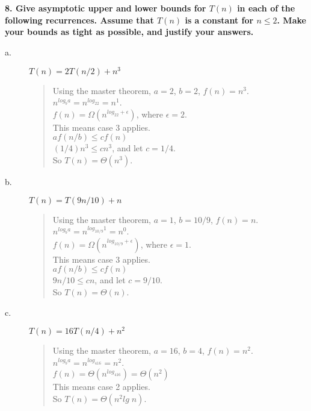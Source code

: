 \documentclass{article}
\begin{document}
\section*{}
\textbf{8. Give asymptotic upper and lower bounds for $T(n)$ in each of the following recurrences.
Assume that $T(n)$ is a constant for $n\leq2$. Make your bounds as tight as possible, 
and justify your answers.}

\begin{description}
\item[a.]$T(n) = 2T(n/2) + n^3$
\begin{quote}
\textsf{Using the master theorem, $a = 2$, $b = 2$, $f(n) = n^3$.\\
$n^{log_ba} = n^{log_22} = n^1$.\\
$f(n) = \Omega(n^{log_22 + \epsilon})$, where $\epsilon = 2$.\\
This means case 3 applies.\\
$af(n/b) \leq cf(n)$\\
$(1/4)n^3 \leq cn^3$, and let $c = 1/4$.\\
So $T(n) = \Theta(n^3)$.}
\end{quote}

\item[b.]$T(n) = T(9n/10) + n$
\begin{quote}
\textsf{Using the master theorem, $a = 1$, $b = 10/9$, $f(n) = n$.\\
$n^{log_ba} = n^{log_{10/9}1} = n^0$.\\
$f(n) = \Omega(n^{log_{10/9} + \epsilon})$, where $\epsilon = 1$.\\
This means case 3 applies.\\
$af(n/b) \leq cf(n)$\\
$9n/10 \leq cn$, and let $c = 9/10$.\\
So $T(n) = \Theta(n)$.}
\end{quote}

\item[c.]$T(n) = 16T(n/4) + n^2$
\begin{quote}
\textsf{Using the master theorem, $a = 16$, $b = 4$, $f(n) = n^2$.\\
$n^{log_ba} = n^{log_416} = n^2$.\\
$f(n) = \Theta(n^{log_416}) = \Theta(n^2)$\\
This means case 2 applies.\\
So $T(n) = \Theta(n^2lg\; n)$.}
\end{quote}

\pagebreak


\end{description}
\end{document}
